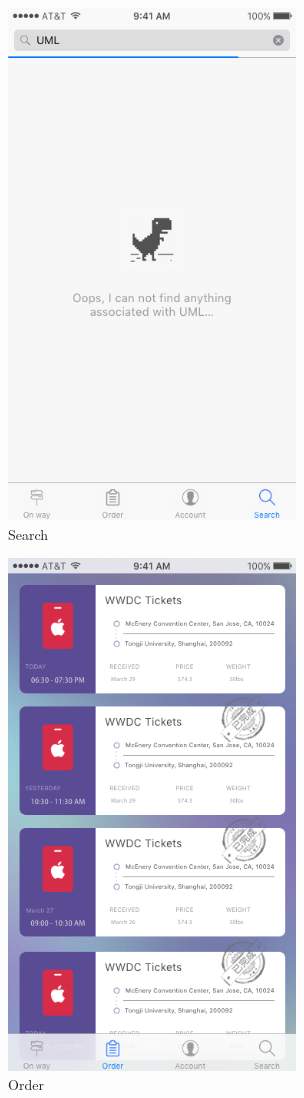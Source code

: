 \documentclass[12pt]{scrreprt}
\begin{document}
\begin{figure}[htbp]
  \centering\includegraphics[width=3in]{DocumentRes/Search.png}
  \caption{Search}
\end{figure}
\begin{figure}[htbp]
  \centering\includegraphics[width=3in]{DocumentRes/Order.png}
  \caption{Order}
\end{figure}
\end{document}
